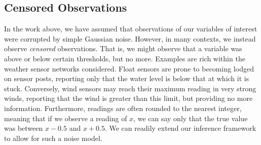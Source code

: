 \documentclass{acmtrans2m}
\begin{document}
\subsection{Censored Observations}\label{sec:censored}

In the work above, we have assumed that observations of our variables of interest were corrupted by simple Gaussian noise. However, in many contexts, we instead observe \emph{censored} observations. That is, we might observe that a variable was above or below certain thresholds, but no more. Examples are rich within the weather sensor networks considered. Float sensors are prone to becoming lodged on sensor posts, reporting only that the water level is below that at which it is stuck. Conversely, wind sensors may reach their maximum reading in very strong winds, reporting that the wind is greater than this limit, but providing no more information. Furthermore, readings are often rounded to the nearest integer, meaning that if we observe a reading of $x$, we can say only that the true value was between $x-0.5$ and $x+0.5$. We can readily extend our inference framework to allow for such a noise model. 
\end{document}
